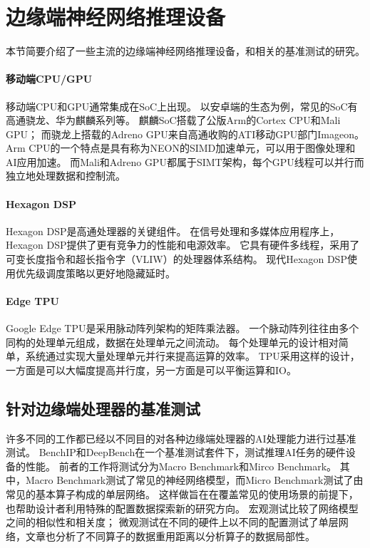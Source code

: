 \section{边缘端神经网络推理设备}
本节简要介绍了一些主流的边缘端神经网络推理设备，和相关的基准测试的研究。

\paragraph{移动端CPU/GPU}
移动端CPU和GPU通常集成在SoC上出现。
以安卓端的生态为例，常见的SoC有高通骁龙、华为麒麟系列等。
麒麟SoC搭载了公版Arm的Cortex CPU和Mali GPU；
而骁龙上搭载的Adreno GPU来自高通收购的ATI移动GPU部门Imageon。
Arm CPU的一个特点是具有称为NEON的SIMD加速单元，可以用于图像处理和AI应用加速。
而Mali和Adreno GPU都属于SIMT架构，每个GPU线程可以并行而独立地处理数据和控制流。

\paragraph{Hexagon DSP}
Hexagon DSP是高通处理器的关键组件。
在信号处理和多媒体应用程序上，Hexagon DSP提供了更有竞争力的性能和电源效率。
它具有硬件多线程，采用了可变长度指令和超长指令字（VLIW）的处理器体系结构。
现代Hexagon DSP使用优先级调度策略以更好地隐藏延时。

\paragraph{Edge TPU}
Google Edge TPU是采用脉动阵列架构的矩阵乘法器。
一个脉动阵列往往由多个同构的处理单元组成，数据在处理单元之间流动。
每个处理单元的设计相对简单，系统通过实现大量处理单元并行来提高运算的效率。
TPU采用这样的设计，一方面是可以大幅度提高并行度，另一方面是可以平衡运算和IO。

\subsection{针对边缘端处理器的基准测试}
许多不同的工作都已经以不同目的对各种边缘端处理器的AI处理能力进行过基准测试。
BenchIP\cite{tao2017benchip}和DeepBench\cite{deepbench}在一个基准测试套件下，测试推理AI任务的硬件设备的性能。
前者的工作将测试分为Macro Benchmark和Mirco Benchmark。
其中，Macro Benchmark测试了常见的神经网络模型，而Micro Benchmark测试了由常见的基本算子构成的单层网络。
这样做旨在在覆盖常见的使用场景的前提下，也帮助设计者利用特殊的配置数据探索新的研究方向。
宏观测试比较了网络模型之间的相似性和相关度；
微观测试在不同的硬件上以不同的配置测试了单层网络，文章也分析了不同算子的数据重用距离以分析算子的数据局部性。